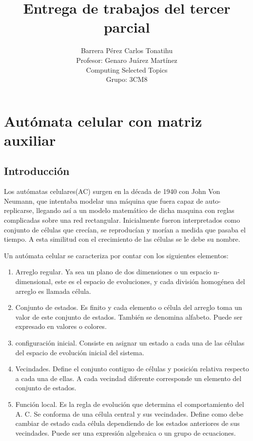 \documentclass[a4paper,12pt]{article}
\title{Entrega de trabajos del tercer parcial}
\author{Barrera Pérez Carlos Tonatihu \\ Profesor: Genaro Juárez Martínez \\ Computing Selected Topics \\ Grupo: 3CM8 }
\begin{document}
\maketitle
\newpage
\tableofcontents
\newpage

\section{Autómata celular con matriz auxiliar}
\subsection{Introducción}
Los autómatas celulares(AC) surgen en la década de 1940 con John Von Neumann, que intentaba modelar una máquina que fuera capaz de auto-replicarse, llegando así a un modelo matemático de dicha maquina con reglas complicadas sobre una red rectangular. Inicialmente fueron interpretados como conjunto de células que crecían, se reproducían y morían a medida que pasaba el tiempo. A esta similitud con el crecimiento de las células se le debe su nombre.\cite{PAGINA}

Un autómata celular se caracteriza por contar con los siguientes elementos:
\begin{enumerate}
 \item Arreglo regular. Ya sea un plano de dos dimensiones o un espacio n-dimensional, este es el espacio de evoluciones, y cada división homogénea del arreglo es llamada célula.
 \item Conjunto de estados. Es finito y cada elemento o célula del arreglo toma un valor de este conjunto de estados. También se denomina alfabeto. Puede ser expresado en valores o colores.
 \item configuración inicial. Consiste en asignar un estado a cada una de las células del espacio de evolución inicial del sistema.
 \item Vecindades. Define el conjunto contiguo de células y posición relativa respecto a cada una de ellas. A cada vecindad diferente corresponde un elemento del conjunto de estados.
 \item Función local. Es la regla de evolución que determina el comportamiento del A. C. Se conforma de una célula central y sus vecindades. Define como debe cambiar de estado cada célula dependiendo de los estados anteriores de sus vecindades. Puede ser una expresión algebraica o un grupo de ecuaciones.
\end{enumerate}
\end{document}
